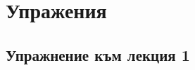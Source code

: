 \documentclass[a4paper,fleqn,12pt]{article}
\theoremstyle{definition}
\begin{document}
\newpage


























































\section{Упражения}

\subsection{Упражнение към лекция 1}
\end{document}
